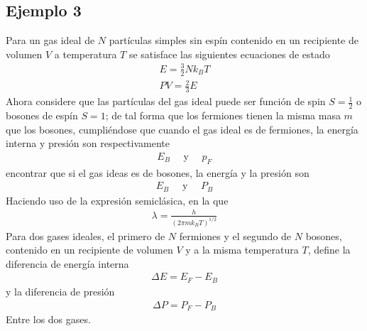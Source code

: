 \documentclass{article}
\begin{document}
\subsection{Ejemplo 3 }
Para un gas ideal de $ N  $ partículas simples sin espín contenido en un recipiente de volumen $ V  $ a temperatura $ T  $ se satisface las siguientes ecuaciones de estado 
\begin{gather*}
  E = \frac{3 }{2 } N k_B T \\
  PV = \frac{2}{3} E 
\end{gather*}
Ahora considere que las partículas del gas ideal puede ser función de spin $ S = \frac{1}{2} $ o bosones de espín $ S = 1  $; de tal forma que los fermiones tienen la misma masa $ m  $ que los bosones, cumpliéndose que cuando el gas ideal es de fermiones, la energía interna y presión son respectivamente 
\begin{gather*}
  E_B \quad \text{ y } \quad p_F  
\end{gather*}
encontrar que si el gas ideas es de bosones, la energía y la presión son 
\begin{gather*}
  E_B \quad \text{ y }\quad P_B 
\end{gather*}
Haciendo uso de la expresión semiclásica, en la que 
\begin{gather*}
  \lambda = \frac{h }{(2 \pi m k_B T )^ {1/2 }} 
\end{gather*}
Para dos gases ideales, el primero de $ N  $ fermiones y el segundo de $ N  $ bosones, contenido en un recipiente de volumen $ V  $ y a la misma temperatura $ T  $, define la diferencia de energía interna 
\begin{gather*}
  \Delta E = E_F - E_B  
\end{gather*}
 y la diferencia de presión 
 \begin{gather*}
  \Delta P = P_F - P_B  
 \end{gather*}
 Entre los dos gases.
\end{document}
